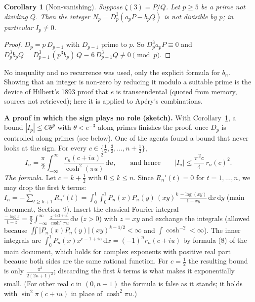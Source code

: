 \documentclass[11pt]{article}
\newcommand{\dd}{\,\mathrm d}
\newtheorem{corollary}[lemma]{Corollary}
\newcommand{\q}[1]{\medskip\noindent\textbf{#1}}
\begin{document}
\begin{corollary}[Non-vanishing]\label{cor:nonvan}
Suppose $\zeta(3)=P/Q$. Let $p\ge5$ be a prime not dividing $Q$. Then the integer
$N_p=D_p^3(a_pP-b_pQ)$ is not divisible by $p$; in particular $I_p\ne0$.
\end{corollary}
\begin{proof}
$D_p=p\,D_{p-1}$ with $D_{p-1}$ prime to $p$. So $D_p^3a_pP\equiv0$ and
$D_p^3b_pQ=D_{p-1}^3\,(p^3b_p)\,Q\equiv6\,D_{p-1}^3Q\not\equiv0\pmod p$.
\end{proof}
\noindent No inequality and no recurrence was used, only the explicit formula for $b_n$. Showing
that an integer is non-zero by reducing it modulo a suitable prime is the device of Hilbert's 1893
proof that $e$ is transcendental (quoted from memory, sources not retrieved); here it is applied to
Ap\'ery's combinations.

\q{A proof in which the sign plays no role (sketch).} With Corollary~\ref{cor:nonvan}, a bound
$|I_p|\le C\theta^p$ with $\theta<e^{-3}$ along primes finishes the proof, once $D_p$ is controlled
along primes (see below). One of the agents found a bound that never looks at the sign. For every
$c\in\{\frac12,\frac32,\dots,n+\frac12\}$,
\begin{equation}\label{line}
I_n=\frac\pi2\int_{-\infty}^{\infty}\frac{r_n(c+iu)^2}{\cosh^2(\pi u)}\dd u,
\qquad\text{and hence}\qquad |I_n|\le\frac{\pi^2c}4\,r_n(c)^2 .
\end{equation}
\emph{The formula.} Let $c=k+\frac12$ with $0\le k\le n$. Since $R_n'(t)=0$ for $t=1,\dots,n$, we
may drop the first $k$ terms:
$I_n=-\sum_{t\ge k+1}R_n'(t)=\int_0^1\!\!\int_0^1P_n(x)P_n(y)\,(xy)^k\,\frac{-\log(xy)}{1-xy}\dd x\dd y$
(main document, Section~9). Insert the classical Fourier integral
$\frac{-\log z}{1-z}=\frac\pi2\int_{-\infty}^\infty\frac{z^{-1/2+iu}}{\cosh^2\pi u}\dd u$ ($z>0$)
with $z=xy$ and exchange the integrals (allowed because
$\iint|P_n(x)P_n(y)|(xy)^{k-1/2}<\infty$ and $\int\cosh^{-2}<\infty$). The inner integrals are
$\int_0^1P_n(x)x^{c-1+iu}\dd x=(-1)^nr_n(c+iu)$ by formula (8) of the main document, which holds for
complex exponents with positive real part because both sides are the same rational function. For
$c=\frac12$ the resulting bound is only $\frac{\pi^2}{2(2n+1)^2}$; discarding the first $k$ terms is
what makes it exponentially small. (For other real $c$ in $(0,n+1)$ the formula is false as it
stands; it holds with $\sin^2\pi(c+iu)$ in place of $\cosh^2\pi u$.)
\end{document}
